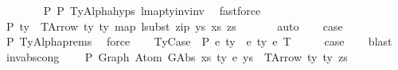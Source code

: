 \begin{isabellebody}
\ \ \ \ \ \ \isamarkupfalse%
\ P{}{}\ P{}{}\ TyAlpha{\isachardot}{\kern0pt}hyps{\isacharparenleft}{\kern0pt}{}{\isacharcomma}{\kern0pt}{}{\isacharcomma}{\kern0pt}{}{\isacharparenright}{\kern0pt}\ lmap{\isacharunderscore}{\kern0pt}ty{\isacharunderscore}{\kern0pt}inv{\isacharunderscore}{\kern0pt}inv\ \isamarkupfalse%
\ fastforce\isanewline
\ \ \isamarkupfalse%
\ \isamarkupfalse%
\ P{}{}{\isacharcolon}{\kern0pt}\ {\isachardoublequoteopen}ty{\isacharprime}{\kern0pt}\ {\isacharequal}{\kern0pt}\ TArrow\ ty{}\ ty{}\ {\isacharparenleft}{\kern0pt}map\ {\isacharparenleft}{\kern0pt}lsubst\ {\isacharparenleft}{\kern0pt}zip\ ys{\isacharprime}{\kern0pt}\ xs{\isacharprime}{\kern0pt}{\isacharparenright}{\kern0pt}{\isacharparenright}{\kern0pt}\ zs{\isacharparenright}{\kern0pt}{\isachardoublequoteclose}\isanewline
\ \ \ \ \ \isamarkupfalse%
\ auto\isanewline
\isanewline
\ \ \isamarkupfalse%
\ {\isacharquery}{\kern0pt}case\isanewline
\ \ \ \isamarkupfalse%
\ P{}{}\ TyAlpha{\isachardot}{\kern0pt}prems{\isacharparenleft}{\kern0pt}{}{\isacharparenright}{\kern0pt}\ \isamarkupfalse%
\ force\isanewline
{}\isamarkupfalse%
\isanewline
\ \ \isamarkupfalse%
\ {\isacharparenleft}{\kern0pt}TyCase\ {\isasymGamma}\ P\ e{}\ ty{}\ {\isasymGamma}{}\ e{}\ ty{}\ e{}\ T{\isacharparenright}{\kern0pt}\isanewline
\ \ \isamarkupfalse%
\ \isamarkupfalse%
\ {\isacharquery}{\kern0pt}case\isanewline
\ \ \isamarkupfalse%
\ blast\isanewline
{}\isamarkupfalse%
%
\endisatagproof
{\isafoldproof}%
%
\isadelimproof
\isanewline
%
\endisadelimproof
\isanewline
\isanewline
\isanewline
\isanewline
{}\isamarkupfalse%
\ inv{\isacharunderscore}{\kern0pt}abs{\isacharunderscore}{\kern0pt}cong{}{\isacharcolon}{\kern0pt}\isanewline
\ \ \ {\isachardoublequoteopen}{\isasymGamma}\ {\isasymturnstile}{\isacharbraceleft}{\kern0pt}P{\isacharbraceright}{\kern0pt}\ {\isacharparenleft}{\kern0pt}Graph\ {\isacharparenleft}{\kern0pt}Atom\ {\isacharparenleft}{\kern0pt}GAbs\ xs\ ty{}\ e{\isacharparenright}{\kern0pt}\ ys{\isacharparenright}{\kern0pt}{\isacharparenright}{\kern0pt}\ {\isacharcolon}{\kern0pt}\ TArrow\ ty{}{\isacharprime}{\kern0pt}\ ty{}\ zs{\isachardoublequoteclose}\isanewline

\end{isabellebody}
